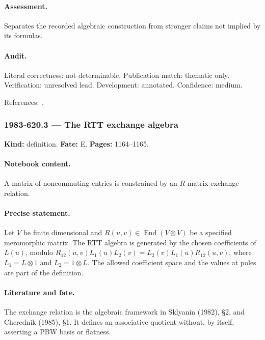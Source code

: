 \paragraph{Assessment.} Separates the recorded algebraic construction from stronger claims not implied by its formulas.

\paragraph{Audit.} Literal correctness: not determinable. Publication match: thematic only. Verification: unresolved lead. Development: annotated. Confidence: medium.

\noindent References: \citep{sklyanin1982algebraic,cherednik1985finite}.\par

\subsubsection{1983-620.3 --- The RTT exchange algebra}

\label{item:1983-620.3}

\noindent\textbf{Kind:} definition. \textbf{Fate:} E. \textbf{Pages:} 1164--1165.\par

\paragraph{Notebook content.} A matrix of noncommuting entries is constrained by an \(R\)-matrix exchange relation.

\paragraph{Precise statement.} Let \(V\) be finite dimensional and \(R(u,v)\in\operatorname{End}(V\otimes V)\) be a specified meromorphic matrix. The RTT algebra is generated by the chosen coefficients of \(L(u)\), modulo \(R_{12}(u,v)L_1(u)L_2(v)=L_2(v)L_1(u)R_{12}(u,v)\), where \(L_1=L\otimes1\) and \(L_2=1\otimes L\). The allowed coefficient space and the values at poles are part of the definition.

\paragraph{Literature and fate.} The exchange relation is the algebraic framework in Sklyanin (1982), \S2, and Cherednik (1985), \S1. It defines an associative quotient without, by itself, asserting a PBW basis or flatness.

